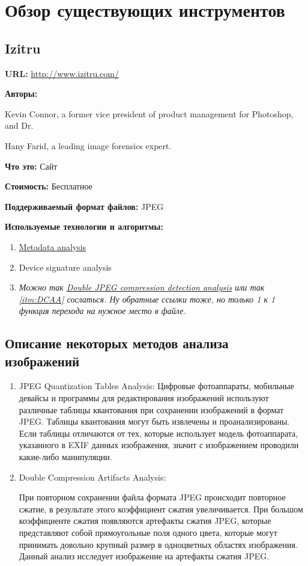 \chapter*{Обзор существующих инструментов}
\setcounter{chapter}{1}
%

\section{Izitru}

\textbf{URL: } \url{http://www.izitru.com/}

\textbf{Авторы:}

Kevin Connor, a former vice president of product management for Photoshop, and Dr.

Hany Farid, a leading image forensics expert.

\textbf{Что это:} Сайт

\textbf{Стоимость:} Бесплатное

\textbf{Поддерживаемый формат файлов:} JPEG

\textbf{Используемые технологии и алгоритмы:}
\begin{enumerate}
  \item \href{http://fotoforensics.com/tutorial-meta.php}{Metadata analysis}
  \item Device signature analysis
  \item \emph{Можно так \hyperlink{itm:DCAA}{Double JPEG compression detection analysis} или так \autoref{itm:DCAA} сослаться. Ну обратные ссылки тоже, но только 1 к 1 функция перехода на нужное место в файле.}
\end{enumerate}

\newpage
\section{Описание некоторых методов анализа изображений}
\begin{enumerate}
  \item JPEG Quantization Tables Analysis:
Цифровые фотоаппараты, мобильные девайсы и программы для редактирования
изображений используют различные таблицы квантования при сохранении изображений в
формат JPEG. Таблицы квантования могут быть извлечены и проанализированы. Если
таблицы отличаются от тех, которые использует модель фотоаппарата, указанного в EXIF
данных изображения, значит с изображением проводили какие-либо манипуляции.
  \label{itm:DCAA}
  \item \hypertarget{itm:DCAA}{Double Compression Artifacts Analysis:} 
При повторном сохранении файла формата JPEG происходит повторное сжатие, в
результате этого коэффициент сжатия увеличивается. При большом коэффициенте
сжатия появляются артефакты сжатия JPEG, которые представляют собой
прямоугольные поля одного цвета, которые могут принимать довольно крупный размер в
одноцветных областях изображения. Данный анализ исследует изображение на
артефакты сжатия JPEG.
\end{enumerate}
